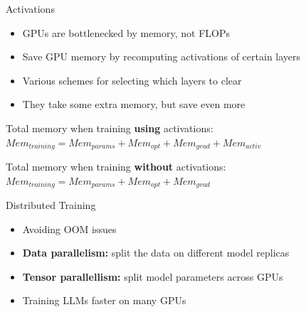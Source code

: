 
\begin{vbframe}{Activations}

\vfill

\begin{itemize}
 	\item GPUs are bottlenecked by memory, not FLOPs
 	\item Save GPU memory by recomputing activations of certain layers
	\item Various schemes for selecting which layers to clear
	\item They take some extra memory, but save even more
\end{itemize}

\vskip5mm

Total memory when training \textbf{using} activations: \newline
$Mem_{training} = Mem_{params} + Mem_{opt} + Mem_{grad} + Mem_{activ}$

\vskip5mm


Total memory when training \textbf{without} activations: \newline
$Mem_{training} = Mem_{params} + Mem_{opt} + Mem_{grad}$

\vskip5mm


\vfill

\end{vbframe}


\begin{vbframe}{Distributed Training}

\vfill

\begin{itemize}
 	\item Avoiding OOM issues
	\item \textbf{Data parallelism:} split the data on different model replicas
	\item \textbf{Tensor parallellism:} split model parameters across GPUs
 	\item Training LLMs faster on many GPUs
\end{itemize}

\vfill

\end{vbframe}

